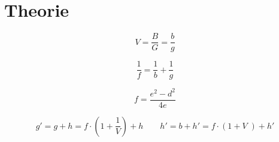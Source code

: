 \section{Theorie}
\label{sec:Theorie}

\begin{equation}
  V = \frac{B}{G} = \frac{b}{g}
  \label{eqn:AG}
\end{equation}

\begin{equation}
  \frac{1}{f} = \frac{1}{b} + \frac{1}{g}
  \label{eqn:LG}
\end{equation}

\begin{equation}
  f = \frac{e^2 - d^2}{4e}
  \label{eqn:bessel}
\end{equation}

\begin{equation}
  g' = g + h = f \cdot \left( 1 + \frac{1}{V}\right) + h
  \qquad
  h' = b + h' = f \cdot \left( 1+ V \;\right) + h'
\end{equation}
